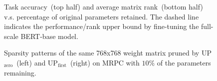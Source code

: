 \begin{figure}[t]
	\centering
	\caption{Task accuracy~(top half) and average matrix rank~(bottom half) 
v.s. percentage of original parameters retained. 
The dashed line indicates the performance/rank upper bound by fine-tuning the full-scale BERT-base model.}
	\label{fig:pre}
\end{figure}

\begin{figure}[t]
	\centering
	\caption{Sparsity patterns of the same 768x768 weight matrix  pruned by UP$_\text{zero}$~(left) and UP$_\text{first}$~(right) on MRPC with $10\%$ of
the parameters remaining.}
	\label{fig:pattern}
\end{figure}

